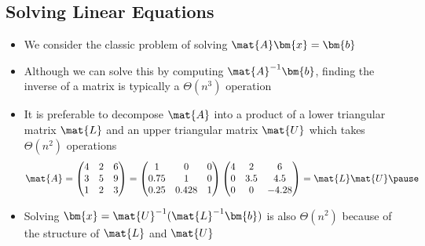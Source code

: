 \begin{slide}
\section[-2]{Solving Linear Equations}

\begin{PauseHighLight}
  \begin{itemize}
  \item We consider the classic problem of solving $\mat{A} \bm{x} =
    \bm{b}$\pause
  \item Although we can solve this by computing $\mat{A}^{-1} \bm{b}$,
    finding the inverse of a matrix is typically a $\Theta(n^3)$
    operation\pause
  \item It is preferable to decompose $\mat{A}$ into a product of a lower
    triangular matrix $\mat{L}$ and an upper triangular matrix $\mat{U}$
    which takes $\Theta(n^2)$ operations
    \begin{align*}
      \mat{A} =
      \begin{pmatrix}
        4 & 2 & 6 \\
        3 & 5 & 9 \\
        1 & 2 & 3
      \end{pmatrix}
      =
      \begin{pmatrix}
        1 & 0 & 0 \\
        0.75 & 1 & 0 \\
        0.25 & 0.428 & 1
      \end{pmatrix}
      \begin{pmatrix}
        4 & 2 & 6\\
        0 & 3.5 & 4.5\\
        0 & 0 & -4.28\\
      \end{pmatrix}
      = \mat{L} \mat{U}\pause
    \end{align*}
  \item Solving $\bm{x} = \mat{U}^{-1} (\mat{L}^{-1} \bm{b})$ is also
    $\Theta(n^2)$ because of the structure of $\mat{L}$ and
    $\mat{U}$\pause
  \end{itemize}
\end{PauseHighLight}

\end{slide}


